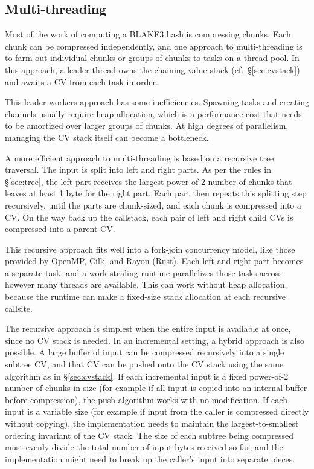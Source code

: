 \documentclass[11pt,notitlepage,a4paper]{article}
\begin{document}
\subsection{Multi-threading}\label{sec:multithreading}

Most of the work of computing a BLAKE3 hash is compressing chunks. Each chunk
can be compressed independently, and one approach to multi-threading is to farm
out individual chunks or groups of chunks to tasks on a thread pool. In this
approach, a leader thread owns the chaining value stack
(cf.~\S\ref{sec:cvstack}) and awaits a CV from each task in order.

This leader-workers approach has some inefficiencies. Spawning tasks and
creating channels usually require heap allocation, which is a performance cost
that needs to be amortized over larger groups of chunks. At high degrees of
parallelism, managing the CV stack itself can become a bottleneck.

A more efficient approach to multi-threading is based on a recursive tree
traversal. The input is split into left and right parts. As per the rules in
\S\ref{sec:tree}, the left part receives the largest power-of-2 number of
chunks that leaves at least 1 byte for the right part. Each part then repeats
this splitting step recursively, until the parts are chunk-sized, and each
chunk is compressed into a CV. On the way back up the callstack, each pair of
left and right child CVs is compressed into a parent CV.

This recursive approach fits well into a fork-join concurrency model, like
those provided by OpenMP, Cilk, and Rayon (Rust). Each left and right part
becomes a separate task, and a work-stealing runtime parallelizes those tasks
across however many threads are available. This can work without heap
allocation, because the runtime can make a fixed-size stack allocation at each
recursive callsite.

The recursive approach is simplest when the entire input is available at once,
since no CV stack is needed. In an incremental setting, a hybrid approach is
also possible. A large buffer of input can be compressed recursively into a
single subtree CV, and that CV can be pushed onto the CV stack using the same
algorithm as in \S\ref{sec:cvstack}. If each incremental input is a fixed
power-of-2 number of chunks in size (for example if all input is copied into an
internal buffer before compression), the push algorithm works with no
modification. If each input is a variable size (for example if input from the
caller is compressed directly without copying), the implementation needs to
maintain the largest-to-smallest ordering invariant of the CV stack. The size
of each subtree being compressed must evenly divide the total number of input
bytes received so far, and the implementation might need to break up the
caller's input into separate pieces.
\end{document}
